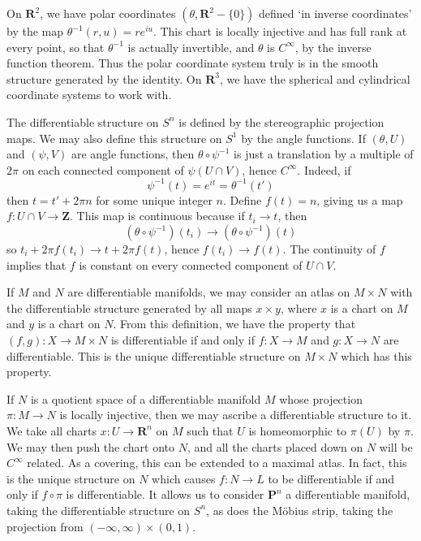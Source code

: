 \begin{example}
    On $\mathbf{R}^2$, we have polar coordinates $(\theta, \mathbf{R}^2 - \{0\})$ defined `in inverse coordinates' by the map $\theta^{-1}(r,u) = re^{iu}$. This chart is locally injective and has full rank at every point, so that $\theta^{-1}$ is actually invertible, and $\theta$ is $C^\infty$, by the inverse function theorem. Thus the polar coordinate system truly is in the smooth structure generated by the identity. On $\mathbf{R}^3$, we have the spherical and cylindrical coordinate systems to work with.
\end{example}

\begin{example}
    The differentiable structure on $S^n$ is defined by the stereographic projection maps. We may also define this structure on $S^1$ by the angle functions. If $(\theta,U)$ and $(\psi,V)$ are angle functions, then $\theta \circ \psi^{-1}$ is just a translation by a multiple of $2\pi$ on each connected component of $\psi(U \cap V)$, hence $C^\infty$. Indeed, if
    \[ \psi^{-1}(t) = e^{it} = \theta^{-1}(t') \]
    then $t = t' + 2 \pi n$ for some unique integer $n$. Define $f(t) = n$, giving us a map $f: U \cap V \to \mathbf{Z}$. This map is continuous because if $t_i \to t$, then
    \[ (\theta \circ \psi^{-1})(t_i) \to (\theta \circ \psi^{-1})(t) \]
    so $t_i + 2 \pi f(t_i) \to t + 2 \pi f(t)$, hence $f(t_i) \to f(t)$. The continuity of $f$ implies that $f$ is constant on every connected component of $U \cap V$.
\end{example}

\begin{example}
    If $M$ and $N$ are differentiable manifolds, we may consider an atlas on $M \times N$ with the differentiable structure generated by all maps $x \times y$, where $x$ is a chart on $M$ and $y$ is a chart on $N$. From this definition, we have the property that $(f,g): X \to M \times N$ is differentiable if and only if $f: X \to M$ and $g: X \to N$ are differentiable. This is the unique differentiable structure on $M \times N$ which has this property.
\end{example}

\begin{example}
    If $N$ is a quotient space of a differentiable manifold $M$ whose projection $\pi:M \to N$ is locally injective, then we may ascribe a differentiable structure to it. We take all charts $x:U \to \mathbf{R}^n$ on $M$ such that $U$ is homeomorphic to $\pi(U)$ by $\pi$. We may then push the chart onto $N$, and all the charts placed down on $N$ will be $C^\infty$ related. As a covering, this can be extended to a maximal atlas. In fact, this is the unique structure on $N$ which causes $f: N \to L$ to be differentiable if and only if $f \circ \pi$ is differentiable. It allows us to consider $\mathbf{P}^n$ a differentiable manifold, taking the differentiable structure on $S^n$, as does the M\"{o}bius strip, taking the projection from $(-\infty, \infty) \times (0,1)$.
\end{example}

